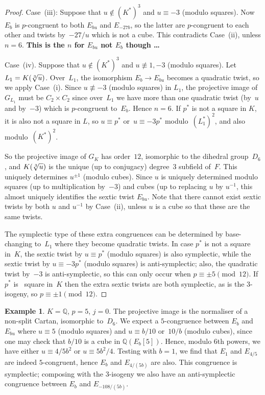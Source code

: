 \documentclass[12pt, reqno]{amsart}
\newcommand{\Q}{\mathbb{Q}}
\numberwithin{equation}{section}
\theoremstyle{definition}
\newtheorem{example}[theorem]{Example}
\theoremstyle{remark}
\begin{document}
\begin{proof}
Case~(iii): Suppose that $u\not\in(K^*)^3$ and $u\equiv-3$ (modulo
squares).  Now $E_b$ is $p$-congruent to both $E_{bu}$ and $E_{-27b}$,
so the latter are $p$-congruent to each other and twists by~$-27/u$
which is not a cube.  This contradicts Case~(ii), unless $n=6$.
\textbf{This is the $n$ for $E_{bu}$ not $E_b$ though \dots}

Case~(iv).  Suppose that $u\not\in(K^*)^3$ and $u\not\equiv1,-3$
(modulo squares).  Let $L_1=K(\root3\of{u})$.  Over~$L_1$, the
isomorphism $E_b\to E_{bu}$ becomes a quadratic twist, so we apply
Case~(i).  Since $u\not\equiv-3$ (modulo squares) in $L_1$, the
projective image of $G_{L_1}$ must be $C_2\times C_2$ since over~$L_1$
we have more than one quadratic twist (by~$u$ and by~$-3$) which is
$p$-congruent to~$E_b$.  Hence $n=6$.  If $p^*$ is not a square in
$K$, it is also not a square in $L$, so $u\equiv p^*$
or~$u\equiv-3p^*$ modulo~$(L_1^*)^2$, and also modulo~$(K^*)^2$.

So the projective image of $G_K$ has order~$12$, isomorphic to the
dihedral group~$D_6$, and $K(\root3\of{u})$ is the unique (up to
conjugacy) degree~$3$ subfield of~$F$.  This uniquely determines
$u^{\pm1}$ (modulo cubes).  Since $u$ is uniquely determined modulo
squares (up to multiplication by~$-3$) and cubes (up to replacing $u$
by $u^{-1}$, this almost uniquely identifies the sextic twist
$E_{bu}$.  Note that there cannot exist sextic twists by both $u$ and
$u^{-1}$ by Case~(ii), unless $u$ is a cube so that these are the same
twists.

The symplectic type of these extra congruences can be determined by
base-changing to~$L_1$ where they become quadratic twists.  In case
$p^*$ is not a square in~$K$, the sextic twist by $u\equiv p^*$
(modulo squares) is also symplectic, while the sextic twist by
$u\equiv -3p^*$ (modulo squares) is anti-symplectic; also, the
quadratic twist by~$-3$ is anti-symplectic, so this can only occur
when $p\equiv\pm5\pmod{12}$.  If $p^*$ is \ square in~$K$ then the
extra sextic twists are both symplectic, as is the $3$-isogeny, so
$p\equiv\pm1\pmod{12}$.
\end{proof}



\begin{example}
$K=\Q$, $p=5$, $j=0$.  The projective image is the normaliser of a
  non-split Cartan, isomorphic to~$D_6$.  We expect a
  $5$-congruence between $E_b$ and $E_{bu}$ where $u\equiv5$ (modulo
  squares) and $u\equiv b/10$ or~$10/b$ (modulo cubes), since one may
  check that $b/10$ is a cube in $\Q(E_b[5])$.  Hence, modulo $6$th
  powers, we have either $u\equiv 4/5b^2$ or $u\equiv 5b^2/4$.
  Testing with $b=1$, we find that $E_1$ and $E_{4/5}$ are indeed
  $5$-congruent, hence $E_b$ and $E_{4/(5b)}$ are also.  This
  congruence is symplectic; composing with the $3$-isogeny we also
  have an anti-symplectic congruence between $E_b$ and
  $E_{-108/(5b)}$.
\end{example}
\end{document}
